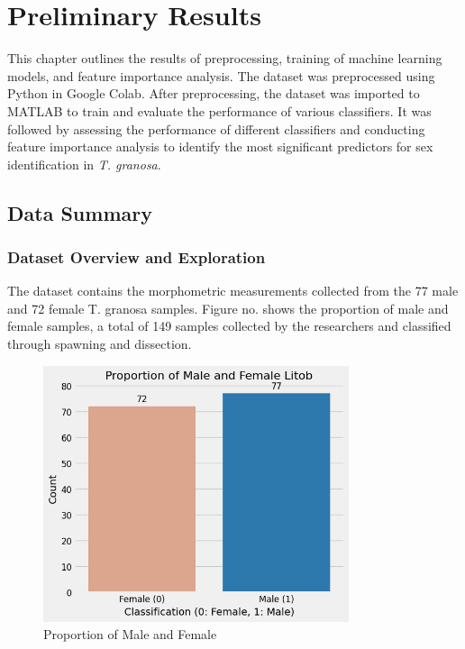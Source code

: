 
\chapter{Preliminary Results}
This chapter outlines the results of preprocessing, training of machine learning models, and feature importance analysis. The dataset was preprocessed using Python in Google Colab. After preprocessing, the dataset was imported to MATLAB to train and evaluate the performance of various classifiers. It was followed by assessing the performance of different classifiers and conducting feature importance analysis to identify the most significant predictors for sex identification in \textit{T. granosa}.

\section{Data Summary}
\subsection{Dataset Overview and Exploration}

The dataset contains the morphometric measurements collected from the 77 male and 72 female T. granosa samples. Figure no. shows the proportion of male and female samples, a total of 149 samples collected by the researchers and classified through spawning and dissection. 

\newpage

\begin{figure}[!htbp]
	\centering
	\includegraphics[width=0.8\textwidth]{figures/test-train.png}
	\caption{Proportion of Male and Female \Tgranosa}
	\label{fig:test-train}
\end{figure}


